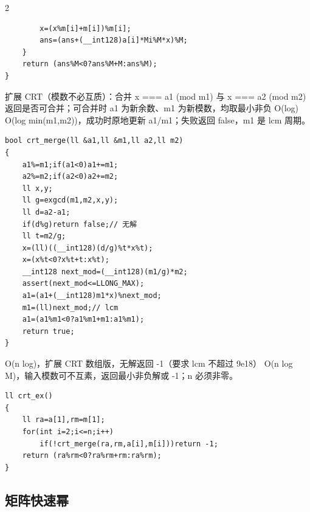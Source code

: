 \documentclass[UTF8,fontset=fandol,a4paper,twoside]{ctexart}
\newcommand{\note}[1]{{\fontsize{10}{12}\selectfont #1\par}}
\begin{document}
\begin{multicols}{2}
\begin{lstlisting}
        x=(x%m[i]+m[i])%m[i];
        ans=(ans+(__int128)a[i]*Mi%M*x)%M;
    }
    return (ans%M<0?ans%M+M:ans%M);
}
\end{lstlisting}
\note{扩展 CRT（模数不必互质）：合并 x =\allowbreak{}=\allowbreak{}=\allowbreak{} a1 (\allowbreak{}mod m1)\allowbreak{} 与 x =\allowbreak{}=\allowbreak{}=\allowbreak{} a2 (\allowbreak{}mod m2)\allowbreak{} 返回是否可合并；可合并时 a1 为新余数、m1 为新模数，均取最小非负 O(\allowbreak{}log)\allowbreak{} O(\allowbreak{}log min(\allowbreak{}m1,\allowbreak{}m2)\allowbreak{})\allowbreak{}，成功时原地更新 a1/\allowbreak{}m1；失败返回 false，m1 是 lcm 周期。}
\begin{lstlisting}
bool crt_merge(ll &a1,ll &m1,ll a2,ll m2)
{
    a1%=m1;if(a1<0)a1+=m1;
    a2%=m2;if(a2<0)a2+=m2;
    ll x,y;
    ll g=exgcd(m1,m2,x,y);
    ll d=a2-a1;
    if(d%g)return false;// 无解
    ll t=m2/g;
    x=(ll)((__int128)(d/g)%t*x%t);
    x=(x%t<0?x%t+t:x%t);
    __int128 next_mod=(__int128)(m1/g)*m2;
    assert(next_mod<=LLONG_MAX);
    a1=(a1+(__int128)m1*x)%next_mod;
    m1=(ll)next_mod;// lcm
    a1=(a1%m1<0?a1%m1+m1:a1%m1);
    return true;
}
\end{lstlisting}
\note{O(\allowbreak{}n log)\allowbreak{}，扩展 CRT 数组版，无解返回 -\allowbreak{}1（要求 lcm 不超过 9e18） O(\allowbreak{}n log M)\allowbreak{}，输入模数可不互素，返回最小非负解或 -\allowbreak{}1；n 必须非零。}
\begin{lstlisting}
ll crt_ex()
{
    ll ra=a[1],rm=m[1];
    for(int i=2;i<=n;i++)
        if(!crt_merge(ra,rm,a[i],m[i]))return -1;
    return (ra%rm<0?ra%rm+rm:ra%rm);
}
\end{lstlisting}
\subsection{矩阵快速幂}


\end{multicols}
\end{document}
